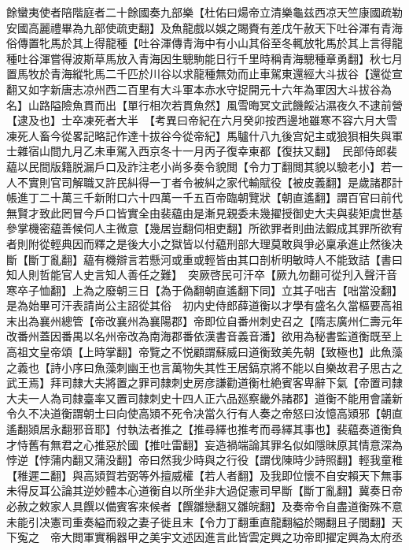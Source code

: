 餘蠻夷使者陪階庭者二十餘國奏九部樂【杜佑曰煬帝立清樂龜兹西凉天竺康國疏勒安國高麗禮畢為九部使疏吏翻】及魚龍戲以娛之賜賚有差戊午赦天下吐谷渾有青海俗傳置牝馬於其上得龍種【吐谷渾傳青海中有小山其俗至冬輒放牝馬於其上言得龍種吐谷渾嘗得波斯草馬放入青海因生驄駒能日行千里時稱青海驄種章勇翻】秋七月置馬牧於青海縱牝馬二千匹於川谷以求龍種無効而止車駕東還經大斗拔谷【還從宣翻又如字新唐志凉州西二百里有大斗軍本赤水守捉開元十六年為軍因大斗拔谷為名】山路隘險魚貫而出【單行相次若貫魚然】風雪晦冥文武饑餒沾濕夜久不逮前營【逮及也】士卒凍死者大半　【考異曰帝紀在六月癸卯按西邊地雖寒不容六月大雪凍死人畜今從畧記略記作達十拔谷今從帝紀】馬驢什八九後宫妃主或狼狽相失與軍士雜宿山間九月乙未車駕入西京冬十一月丙子復幸東都【復扶又翻】　民部侍郎裴藴以民間版籍脱漏戶口及詐注老小尚多奏令貌閲【令力丁翻閲其貌以驗老小】若一人不實則官司解職又許民糾得一丁者令被糾之家代輸賦役【被皮義翻】是歲諸郡計帳進丁二十萬三千新附口六十四萬一千五百帝臨朝覽狀【朝直遙翻】謂百官曰前代無賢才致此罔冒今戶口皆實全由裴藴由是漸見親委未幾擢授御史大夫與裴矩虞世基參掌機密藴善候伺人主微意【幾居豈翻伺相吏翻】所欲罪者則曲法鍜成其罪所欲宥者則附從輕典因而釋之是後大小之獄皆以付藴刑部大理莫敢與爭必稟承進止然後决斷【斷丁亂翻】藴有機辯言若懸河或重或輕皆由其口剖析明敏時人不能致詰【書曰知人則哲能官人史言知人善任之難】　突厥啓民可汗卒【厥九勿翻可從刋入聲汗音寒卒子恤翻】上為之廢朝三日【為于偽翻朝直遙翻下同】立其子咄吉【咄當没翻】是為始畢可汗表請尚公主詔從其俗　初内史侍郎薛道衡以才學有盛名久當樞要高祖末出為襄州總管【帝改襄州為襄陽郡】帝即位自番州刺史召之【隋志廣州仁壽元年改番州蓋因番禺以名州帝改為南海郡番依漢書音義音潘】欲用為秘書監道衡既至上高祖文皇帝頌【上時掌翻】帝覽之不悦顧謂蘇威曰道衡致美先朝【致極也】此魚藻之義也【詩小序曰魚藻刺幽王也言萬物失其性王居鎬京將不能以自樂故君子思古之武王焉】拜司隸大夫將置之罪司隸刺史房彦謙勸道衡杜絶賓客卑辭下氣【帝置司隸大夫一人為司隸臺率又置司隸刺史十四人正六品廵察畿外諸郡】道衡不能用會議新令久不决道衡謂朝士曰向使高熲不死令决當久行有人奏之帝怒曰汝憶高熲邪【朝直遙翻熲居永翻邪音耶】付執法者推之【推尋繹也推考而尋繹其事也】裴藴奏道衡負才恃舊有無君之心推惡於國【推吐雷翻】妄造禍端論其罪名似如隱昧原其情意深為悖逆【悖蒲内翻又蒲没翻】帝曰然我少時與之行役【謂伐陳時少詩照翻】輕我童稚【稚遲二翻】與高熲賀若弼等外擅威權【若人者翻】及我即位懷不自安賴天下無事未得反耳公論其逆妙體本心道衡自以所坐非大過促憲司早斷【斷丁亂翻】冀奏日帝必赦之敕家人具饌以備賓客來候者【饌雛戀翻又雛皖翻】及奏帝令自盡道衡殊不意未能引决憲司重奏縊而殺之妻子徙且末【令力丁翻重直龍翻縊於賜翻且子閭翻】天下寃之　帝大閲軍實稱器甲之美宇文述因進言此皆雲定興之功帝即擢定興為太府丞


